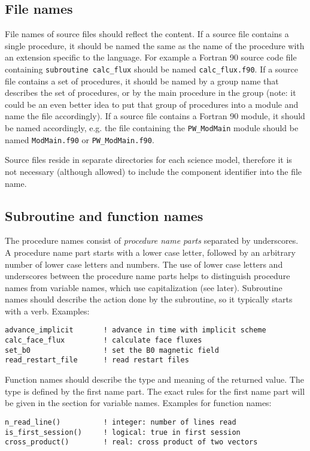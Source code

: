 \documentclass{article}
\begin{document}
\subsection{File names}

File names of source files should reflect the content.
If a source file contains a single procedure, it
should be named the same as the name of the procedure with 
an extension specific to the language.
For example a Fortran 90 source code file containing
{\tt subroutine calc\_flux} should be named
{\tt calc\_flux.f90}. 
If a source file contains a set of procedures,
it should be named by a group name that describes
the set of procedures, or by the main procedure in the group
(note: it could be an even better idea to put that group of procedures
into a module and name the file accordingly).
If a source file contains a Fortran 90 module, it should
be named accordingly, e.g. the file containing the {\tt PW\_ModMain} 
module should be named {\tt ModMain.f90} or {\tt PW\_ModMain.f90}.

Source files reside in separate directories for each science
model, therefore it is not necessary (although allowed)
to include the component identifier into the file name.

\subsection{Subroutine and function names}

The procedure names consist of
{\it procedure name parts} separated by underscores. 
A procedure name part starts with a lower case letter, followed
by an arbitrary number of lower case letters and numbers.
The use of lower case letters and underscores between the procedure 
name parts helps to distinguish procedure names from variable names, 
which use capitalization (see later).
Subroutine names should describe the action done
by the subroutine, so it typically starts with a verb. Examples:
\begin{verbatim}
advance_implicit       ! advance in time with implicit scheme
calc_face_flux         ! calculate face fluxes
set_b0                 ! set the B0 magnetic field
read_restart_file      ! read restart files
\end{verbatim}
Function names should describe the type and meaning of the returned value.
The type is defined by the first name part. The exact rules for the
first name part will be given in the section for variable names. 
Examples for function names:
\begin{verbatim}
n_read_line()          ! integer: number of lines read
is_first_session()     ! logical: true in first session
cross_product()        ! real: cross product of two vectors
\end{verbatim}
\end{document}
